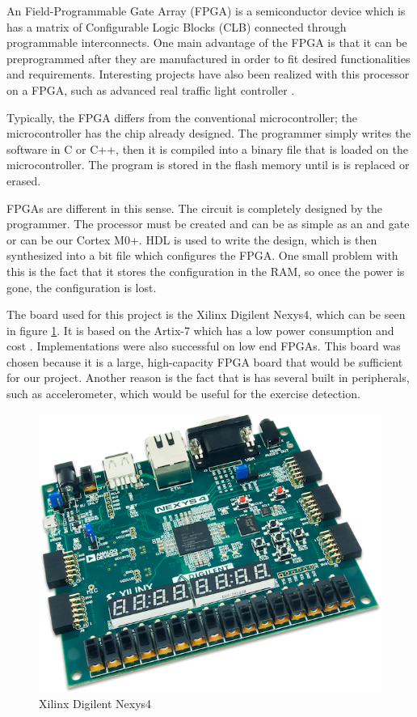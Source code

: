 
An Field-Programmable Gate Array (FPGA) is a semiconductor device which is has a matrix of Configurable Logic Blocks (CLB) connected through programmable interconnects. One main advantage of the FPGA is that it can be preprogrammed after they are manufactured in order to fit desired functionalities and requirements. Interesting projects have also been realized with this processor on a FPGA, such as advanced real traffic light controller \cite{traffic_light}.

Typically, the FPGA differs from the conventional microcontroller; the microcontroller has the chip already designed. The programmer simply writes the software in C or C++, then it is compiled into a binary file that is loaded on the microcontroller. The program is stored in the flash memory until is is replaced or erased.

FPGAs are different in this sense. The circuit is completely designed by the programmer. The processor must be created and can be as simple as an and gate or can be our Cortex M0+. HDL is used to write the design, which is then synthesized into a bit file which configures the FPGA. One small problem with this is the fact that it stores the configuration in the RAM, so once the power is gone, the configuration is lost.

The board used for this project is the Xilinx Digilent Nexys4, which can be seen in figure \ref{fig:nexys4}. It is based on the Artix-7 which has a low power consumption and cost \cite{cortexm0onnexys4}. Implementations were also successful on low end FPGAs. This board was chosen because it is a large, high-capacity FPGA board that would be sufficient for our project. Another reason is the fact that is has several built in peripherals, such as accelerometer, which would be useful for the exercise detection. 

\begin{figure}
\centering
\includegraphics{figures/nexys4.PNG}
\caption{Xilinx Digilent Nexys4 \label{fig:nexys4}}
\end{figure}
